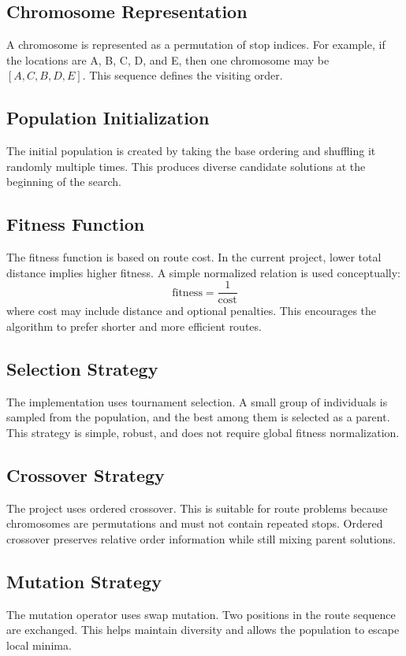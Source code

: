 \subsection{Chromosome Representation}
A chromosome is represented as a permutation of stop indices. For example, if the locations are A, B, C, D, and E, then one chromosome may be \([A, C, B, D, E]\). This sequence defines the visiting order.

\subsection{Population Initialization}
The initial population is created by taking the base ordering and shuffling it randomly multiple times. This produces diverse candidate solutions at the beginning of the search.

\subsection{Fitness Function}
The fitness function is based on route cost. In the current project, lower total distance implies higher fitness. A simple normalized relation is used conceptually:
\[
\text{fitness} = \frac{1}{\text{cost}}
\]
where cost may include distance and optional penalties. This encourages the algorithm to prefer shorter and more efficient routes.

\subsection{Selection Strategy}
The implementation uses tournament selection. A small group of individuals is sampled from the population, and the best among them is selected as a parent. This strategy is simple, robust, and does not require global fitness normalization.

\subsection{Crossover Strategy}
The project uses ordered crossover. This is suitable for route problems because chromosomes are permutations and must not contain repeated stops. Ordered crossover preserves relative order information while still mixing parent solutions.

\subsection{Mutation Strategy}
The mutation operator uses swap mutation. Two positions in the route sequence are exchanged. This helps maintain diversity and allows the population to escape local minima.

